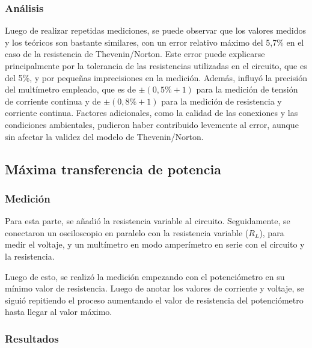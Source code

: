 \documentclass{article}
\begin{document}
            \subsubsection{Análisis}

            \quad Luego de realizar repetidas mediciones, se puede observar que los valores medidos y los teóricos son bastante similares, 
            con un error relativo máximo del 5,7\% en el caso de la resistencia de Thevenin/Norton. 
            Este error puede explicarse principalmente por la tolerancia de las resistencias utilizadas en el circuito, 
            que es del 5\%, y por pequeñas imprecisiones en la medición. Además, influyó la precisión del multímetro empleado, 
            que es de $\pm(0,5\% + 1)$ para la medición de tensión de corriente continua y de $\pm (0,8\% + 1)$ para la medición 
            de resistencia y corriente continua. 
            Factores adicionales, como la calidad de las conexiones y las condiciones ambientales, pudieron haber contribuido 
            levemente al error, aunque sin afectar la validez del modelo de Thevenin/Norton.
        \subsection{Máxima transferencia de potencia}

            \subsubsection{Medición}

            \quad Para esta parte, se añadió la resistencia variable al circuito. Seguidamente, se conectaron 
            un osciloscopio en paralelo con la resistencia variable ($R_{L}$), para medir el voltaje, y un 
            multímetro en modo amperímetro en serie con el circuito y la resistencia.\par
            Luego de esto, se realizó la medición empezando con el potenciómetro en su mínimo valor de 
            resistencia. Luego de anotar los valores de corriente y voltaje, se siguió repitiendo el 
            proceso aumentando el valor de resistencia del potenciómetro hasta llegar al valor máximo.\par
            

            \subsubsection{Resultados}
            
\end{document}
